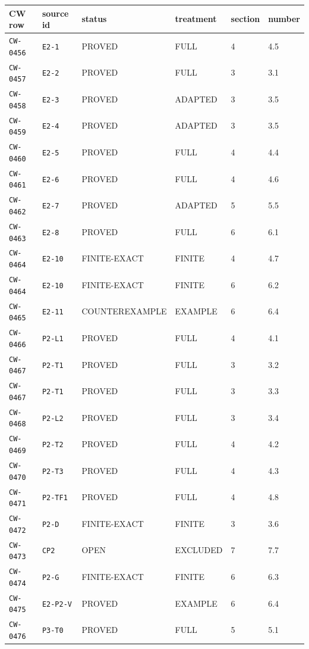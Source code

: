 \begin{center}\scriptsize
\begin{tabular}{@{}llllll@{}}\toprule
CW row & source id & status & treatment & section & number\\\midrule
\texttt{CW-0456} & \texttt{E2-1} & PROVED & FULL & 4 & 4.5\\
\texttt{CW-0457} & \texttt{E2-2} & PROVED & FULL & 3 & 3.1\\
\texttt{CW-0458} & \texttt{E2-3} & PROVED & ADAPTED & 3 & 3.5\\
\texttt{CW-0459} & \texttt{E2-4} & PROVED & ADAPTED & 3 & 3.5\\
\texttt{CW-0460} & \texttt{E2-5} & PROVED & FULL & 4 & 4.4\\
\texttt{CW-0461} & \texttt{E2-6} & PROVED & FULL & 4 & 4.6\\
\texttt{CW-0462} & \texttt{E2-7} & PROVED & ADAPTED & 5 & 5.5\\
\texttt{CW-0463} & \texttt{E2-8} & PROVED & FULL & 6 & 6.1\\
\texttt{CW-0464} & \texttt{E2-10} & FINITE-EXACT & FINITE & 4 & 4.7\\
\texttt{CW-0464} & \texttt{E2-10} & FINITE-EXACT & FINITE & 6 & 6.2\\
\texttt{CW-0465} & \texttt{E2-11} & COUNTEREXAMPLE & EXAMPLE & 6 & 6.4\\
\texttt{CW-0466} & \texttt{P2-L1} & PROVED & FULL & 4 & 4.1\\
\texttt{CW-0467} & \texttt{P2-T1} & PROVED & FULL & 3 & 3.2\\
\texttt{CW-0467} & \texttt{P2-T1} & PROVED & FULL & 3 & 3.3\\
\texttt{CW-0468} & \texttt{P2-L2} & PROVED & FULL & 3 & 3.4\\
\texttt{CW-0469} & \texttt{P2-T2} & PROVED & FULL & 4 & 4.2\\
\texttt{CW-0470} & \texttt{P2-T3} & PROVED & FULL & 4 & 4.3\\
\texttt{CW-0471} & \texttt{P2-TF1} & PROVED & FULL & 4 & 4.8\\
\texttt{CW-0472} & \texttt{P2-D} & FINITE-EXACT & FINITE & 3 & 3.6\\
\texttt{CW-0473} & \texttt{CP2} & OPEN & EXCLUDED & 7 & 7.7\\
\texttt{CW-0474} & \texttt{P2-G} & FINITE-EXACT & FINITE & 6 & 6.3\\
\texttt{CW-0475} & \texttt{E2-P2-V} & PROVED & EXAMPLE & 6 & 6.4\\
\texttt{CW-0476} & \texttt{P3-T0} & PROVED & FULL & 5 & 5.1\\

\end{tabular}
\end{center}
